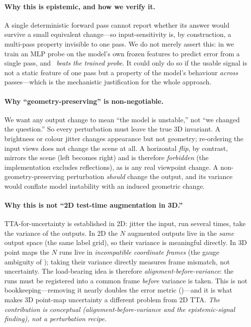 \paragraph{Why this is epistemic, and how we verify it.} A single deterministic forward pass cannot
report whether its answer would survive a small equivalent change---so input-sensitivity is, by
construction, a multi-pass property invisible to one pass. We do not merely assert this: in
 we train an MLP probe on the model's own frozen features to predict error from a
single pass, and \trustr\ \emph{beats the trained probe}. It could only do so if the usable signal is
not a static feature of one pass but a property of the model's behaviour \emph{across} passes---which
is the mechanistic justification for the whole approach.

\paragraph{Why ``geometry-preserving'' is non-negotiable.} We want any output change to mean ``the
model is unstable,'' not ``we changed the question.'' So every perturbation must leave the true 3D
invariant. A brightness or colour jitter changes appearance but not geometry; re-ordering the input
views does not change the scene at all. A horizontal \emph{flip}, by contrast, mirrors the scene
(left becomes right) and is therefore \emph{forbidden} (the implementation excludes reflections), as
is any real viewpoint change. A non-geometry-preserving perturbation \emph{should} change the output,
and its variance would conflate model instability with an induced geometric change.

\paragraph{Why this is not ``2D test-time augmentation in 3D.''} TTA-for-uncertainty is established
in 2D: jitter the input, run several times, take the variance of the outputs. In 2D the $N$ augmented
outputs live in the \emph{same} output space (the same label grid), so their variance is meaningful
directly. In 3D point maps the $N$ runs live in \emph{incompatible coordinate frames} (the gauge
ambiguity of ); taking their variance directly measures frame mismatch, not
uncertainty. The load-bearing idea is therefore \emph{alignment-before-variance}: the runs must be
registered into a common frame \emph{before} variance is taken. This is not bookkeeping---removing it
nearly doubles the error metric ()---and it is what makes 3D point-map
uncertainty a different problem from 2D TTA. \emph{The contribution is conceptual
(alignment-before-variance and the epistemic-signal finding), not a perturbation recipe.}


